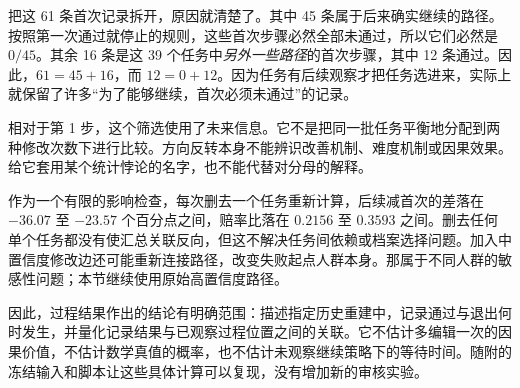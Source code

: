 把这 61 条首次记录拆开，原因就清楚了。其中 45 条属于后来确实继续的路径。按照第一次通过就停止的规则，这些首次步骤必然全部未通过，所以它们必然是 $0/45$。其余 16 条是这 39 个任务中\emph{另外一些路径}的首次步骤，其中 12 条通过。因此，$61=45+16$，而 $12=0+12$。因为任务有后续观察才把任务选进来，实际上就保留了许多“为了能够继续，首次必须未通过”的记录。

相对于第 1 步，这个筛选使用了未来信息。它不是把同一批任务平衡地分配到两种修改次数下进行比较。方向反转本身不能辨识改善机制、难度机制或因果效果。给它套用某个统计悖论的名字，也不能代替对分母的解释。

作为一个有限的影响检查，每次删去一个任务重新计算，后续减首次的差落在 $-36.07$ 至 $-23.57$ 个百分点之间，赔率比落在 $0.2156$ 至 $0.3593$ 之间。删去任何单个任务都没有使汇总关联反向，但这不解决任务间依赖或档案选择问题。加入中置信度修改边还可能重新连接路径，改变失败起点人群本身。那属于不同人群的敏感性问题；本节继续使用原始高置信度路径。

因此，过程结果作出的结论有明确范围：描述指定历史重建中，记录通过与退出何时发生，并量化记录结果与已观察过程位置之间的关联。它不估计多编辑一次的因果价值，不估计数学真值的概率，也不估计未观察继续策略下的等待时间。随附的冻结输入和脚本让这些具体计算可以复现，没有增加新的审核实验。
